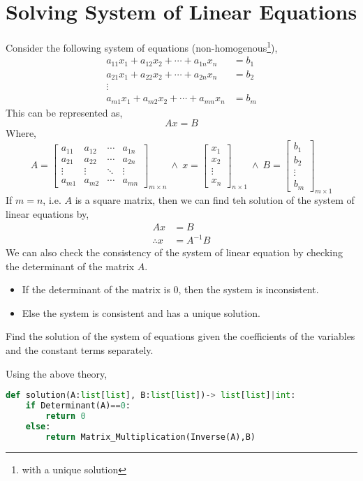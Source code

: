 \section{Solving System of Linear Equations}
Consider the following system of equations (non-homogenous\footnote{with a unique solution}),
\[\begin{split}
	a_{11}x_{1}+a_{12}x_2+\cdots +a_{1n}x_n&=b_1\\
	a_{21}x_{1}+a_{22}x_2+\cdots +a_{2n}x_n&=b_2\\
	\vdots  & \\
	a_{m1}x_{1}+a_{m2}x_2+\cdots +a_{mn}x_n&=b_m
\end{split}\]
This can be represented as,
\[Ax=B\]
Where,
\[A=\begin{bmatrix}
	a_{11} & a_{12} & \cdots & a_{1n}\\
	a_{21} & a_{22} & \cdots & a_{2n}\\
	\vdots & \vdots & \ddots & \vdots \\
	a_{m1} & a_{m2} & \cdots & a_{mn}
\end{bmatrix}_{m\times n} \ \land \ x=\begin{bmatrix}
	x_1\\
	x_2\\
	\vdots\\
	x_n
\end{bmatrix}_{n\times 1} \ \land \ B=\begin{bmatrix}
	b_{1}\\
	b_2\\
	\vdots\\
	b_m
\end{bmatrix}_{m\times 1}\]
If $m=n$, i.e. $A$ is a square matrix, then we can find teh solution of the system of linear equations by,
\[\begin{split}
	Ax&=B\\
	\therefore x&=A^{-1}B
\end{split}\] 
We can also check the consistency of the system of linear equation by checking the determinant of the matrix $A$.
\begin{itemize}
	\item If the determinant of the matrix is 0, then the system is inconsistent.
	\item Else the system is consistent and has a unique solution.
\end{itemize}
\begin{eg}
	Find the solution of the system of equations given the coefficients of the variables and the constant terms separately.
\end{eg}
\begin{explanation}
	Using the above theory,
	\begin{lstlisting}[language=Python]
def solution(A:list[list], B:list[list])-> list[list]|int:
    if Determinant(A)==0:
        return 0
    else:
        return Matrix_Multiplication(Inverse(A),B)\end{lstlisting}
\end{explanation}
